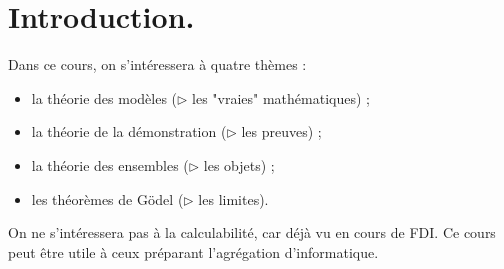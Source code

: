 \documentclass[./main]{subfiles}
\begin{document}
  \chapter*{Introduction.}

  Dans ce cours, on s'intéressera à quatre thèmes :
  \begin{itemize}
    \item la théorie des modèles ($\triangleright$ les "vraies" mathématiques) ;
    \item la théorie de la démonstration ($\triangleright$ les preuves) ;
    \item la théorie des ensembles ($\triangleright$ les objets) ;
    \item les théorèmes de Gödel ($\triangleright$ les limites).
  \end{itemize}
  On ne s'intéressera pas à la calculabilité, car déjà vu en cours de FDI.
  Ce cours peut être utile à ceux préparant l'agrégation d'informatique.
\end{document}
